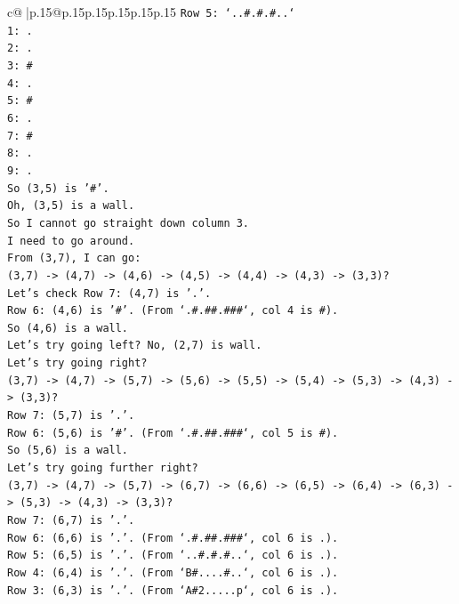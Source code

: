 \documentclass{article}
\begin{document}
{\begin{supertabular}{c@{$\;$}|p{.15\linewidth}@{}p{.15\linewidth}p{.15\linewidth}p{.15\linewidth}p{.15\linewidth}p{.15\linewidth}}
{{{\texttt{Row 5: `..\#.\#.\#..`} \\
\texttt{1: .} \\
\texttt{2: .} \\
\texttt{3: \#} \\
\texttt{4: .} \\
\texttt{5: \#} \\
\texttt{6: .} \\
\texttt{7: \#} \\
\texttt{8: .} \\
\texttt{9: .} \\
\texttt{So (3,5) is '\#'.} \\
\texttt{Oh, (3,5) is a wall.} \\
\texttt{So I cannot go straight down column 3.} \\
\texttt{I need to go around.} \\
\texttt{From (3,7), I can go:} \\
\texttt{(3,7) {-}> (4,7) {-}> (4,6) {-}> (4,5) {-}> (4,4) {-}> (4,3) {-}> (3,3)?} \\
\texttt{Let's check Row 7: (4,7) is '.'.} \\
\texttt{Row 6: (4,6) is '\#'. (From `.\#.\#\#.\#\#\#`, col 4 is \#).} \\
\texttt{So (4,6) is a wall.} \\
\texttt{Let's try going left? No, (2,7) is wall.} \\
\texttt{Let's try going right?} \\
\texttt{(3,7) {-}> (4,7) {-}> (5,7) {-}> (5,6) {-}> (5,5) {-}> (5,4) {-}> (5,3) {-}> (4,3) {-}> (3,3)?} \\
\texttt{Row 7: (5,7) is '.'.} \\
\texttt{Row 6: (5,6) is '\#'. (From `.\#.\#\#.\#\#\#`, col 5 is \#).} \\
\texttt{So (5,6) is a wall.} \\
\texttt{Let's try going further right?} \\
\texttt{(3,7) {-}> (4,7) {-}> (5,7) {-}> (6,7) {-}> (6,6) {-}> (6,5) {-}> (6,4) {-}> (6,3) {-}> (5,3) {-}> (4,3) {-}> (3,3)?} \\
\texttt{Row 7: (6,7) is '.'.} \\
\texttt{Row 6: (6,6) is '.'. (From `.\#.\#\#.\#\#\#`, col 6 is .).} \\
\texttt{Row 5: (6,5) is '.'. (From `..\#.\#.\#..`, col 6 is .).} \\
\texttt{Row 4: (6,4) is '.'. (From `B\#....\#..`, col 6 is .).} \\
\texttt{Row 3: (6,3) is '.'. (From `A\#2.....p`, col 6 is .).} \\
}}}
\end{supertabular}}
\end{document}
